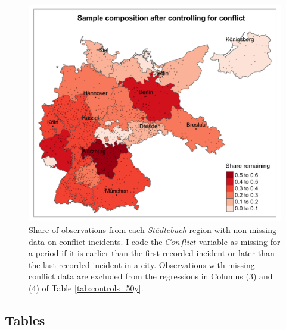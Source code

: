 \documentclass[11pt, a4paper]{article}
\begin{document}
\begin{figure}[ht]
    \centering
    \includegraphics[scale = 0.15]{paper/output/descriptive/map_conflict_NA_50y.png}
    \caption{Share of observations from each \textit{Städtebuch} region with non-missing data on conflict incidents. I code the $Conflict$ variable as missing for a period if it is earlier than the first recorded incident or later than the last recorded incident in a city. Observations with missing conflict data are excluded from the regressions in Columns (3) and (4) of Table \ref{tab:controls_50y}.}
    \label{fig:conflict_map}
\end{figure}

\clearpage
\subsection*{Tables}






\end{document}
